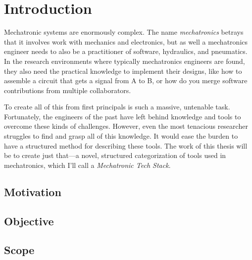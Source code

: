 \documentclass[english,12pt,a4paper,pdftex,eng,utf8]{aaltothesis}
\begin{document}
\cleardoublepage
\storeinipagenumber
{}
\setcounter{page}{1}


\section{Introduction}

\thispagestyle{empty}

Mechatronic systems are enormously complex.  The name {\it mechatronics\/} betrays that it involves work with mechanics and electronics, but as well a mechatronics engineer needs to also be a practitioner of software, hydraulics, and pneumatics.  In the research environments where typically mechatronics engineers are found, they also need the practical knowledge to implement their designs, like how to assemble a circuit that gets a signal from A to B, or how do you merge software contributions from multiple collaborators.

To create all of this from first principals is such a massive, untenable task.  Fortunately, the engineers of the past have left behind knowledge and tools to overcome these kinds of challenges.  However, even the most tenacious researcher struggles to find and grasp all of this knowledge.  It would ease the burden to have a structured method for describing these tools.  The work of this thesis will be to create just that---a novel, structured categorization of tools used in mechatronics, which I'll call a {\it Mechatronic Tech Stack}.

\subsection{Motivation}

\lipsum[1-3]

\subsection{Objective}

\lipsum[1-3]

\subsection{Scope}
\end{document}
